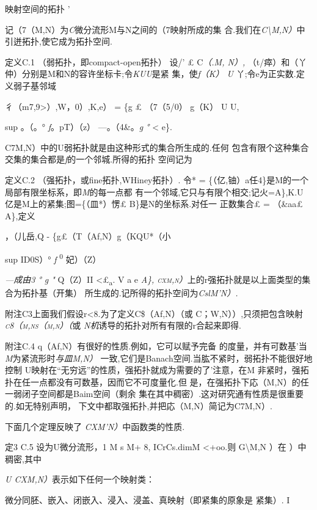 \documentclass{article}
\begin{document}
映射空间的拓扑 '

记（7（M,N）为\emph{C}微分流形M与N之间的（7映射所成的集
合.我们在\emph{C\textbackslash{}M,N）}中引迸拓扑,使它成为拓扑空间.

定义C.1 （弱拓扑，即compact-open拓扑） 设/' £ C\emph{（.M, N）,}
（t/瘁）和（丫仲）分别是M和N的容许坐标卡;令\emph{KUU}是紧
集，使\emph{f（K） U} 丫;令e为正实数.定义弱子基邻域

彳（m7,9\textgreater{}）,W，0）,K,e） = \{g £ （7（5/0）
\textbar{}g（K） U U,

sup \textbar{}\textbar{}。（。° \emph{f}。pT）（z） ---。（4\&。\emph{g
°} \textless{} e\}.

C7M,N）中的U弱拓扑就是由这种形式的集合所生成的.任何
包含有限个这种集合交集的集合都是\emph{f}的一个邻城.所得的拓扑 空间记为

定义C.2 （强拓扑，或fine拓扑,WHiney拓扑）. 令* =
\{（亿,铀）\textbar{}a任4\}是M的一个局部有限坐标系，即\emph{M}的每一点都
有一个邻域,它只与有限个相交;记火=A\},K.U 亿是M上的紧集;图=\{（皿*）愣£
B\}是N的坐标系.对任一 正数集合£ = （\&a\textbar{}a£ A\},定义

，（儿岳,Q - \{g£（T（Af,N）\textbar{}g（KQU*（小

sup ID0S）° \emph{f} \textsuperscript{0} 妃）（Z）

\emph{---成由3 ° g "} Q（Z）II \textless{}£\textsubscript{a}. V a e
\emph{A\},
\textsc{cxm,n）}}上的r强拓扑就是以上面类型的集合为拓扑基（开集）
所生成的.记所得的拓扑空间为\emph{CslM'N）.}

附注C3上面我们假设r\textless{}8.为了定义C\$（Af,N）（或
C；W,N））,只须把包含映射 \emph{\textsc{c8（m,ns（m,n）（}}或
\emph{N机}诱导的拓扑对所有有限的r合起来即得.

附注C.4 q（Af,N）有很好的性质.例如，它可以赋予完备
的度量，并有可数基'当\emph{M}为紧流形时\emph{与皿M,N）}
一致,它们是Banach空间.当肱不紧时，弱拓扑不能很好地控制
U映射在``无穷远''的性质，强拓扑就成为需要的了'注意，在M
非紧时，强拓扑在任一点都没有可数基，因而它不可度量化.但
是，在强拓扑下応（M,N）的任一弱闭子空间都是Baim空间（剩余
集在其中稠密）.这对研究通有性质是很重要的.如无特别声明，
下文中都取强拓扑,并把応（M,N）简记为C7M,N）.

下面几个定理反映了 \emph{CXM'N）}中函数类的性质.

定3 C.5 设为U微分流形，1 M s M+ 8, ICrCs.dimM \textless{}+oo.则
G\textbackslash{}M,N ）在 ）中稠密,其中

\emph{U CXM,N）}表示如下任何一个映射类：

微分同胚、嵌入、闭嵌入、浸入、浸盖、真映射（即紧集的原象是 紧集）. I
\end{document}
